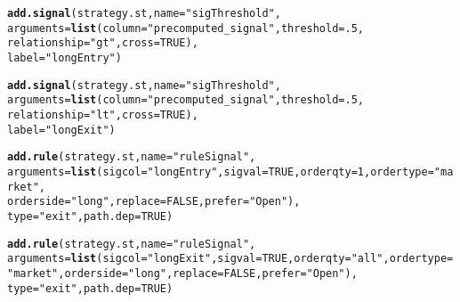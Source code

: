 \documentclass[12pt, a4paper, oneside]{article}\usepackage[]{graphicx}\usepackage[]{color}
\makeatletter
\newcommand{\hlnum}[1]{\textcolor[rgb]{0.686,0.059,0.569}{#1}}%
\newcommand{\hlstr}[1]{\textcolor[rgb]{0.192,0.494,0.8}{#1}}%
\newcommand{\hlstd}[1]{\textcolor[rgb]{0.345,0.345,0.345}{#1}}%
\newcommand{\hlkwc}[1]{\textcolor[rgb]{0.333,0.667,0.333}{#1}}%
\newcommand{\hlkwd}[1]{\textcolor[rgb]{0.737,0.353,0.396}{\textbf{#1}}}%
\newenvironment{kframe}{%
 \def\at@end@of@kframe{}%
 \ifinner\ifhmode%
  \def\at@end@of@kframe{\end{minipage}}%
  \begin{minipage}{\columnwidth}%
 \fi\fi%
 \def\FrameCommand##1{\hskip\@totalleftmargin \hskip-\fboxsep
 \colorbox{shadecolor}{##1}\hskip-\fboxsep
     \hskip-\linewidth \hskip-\@totalleftmargin \hskip\columnwidth}%
 \MakeFramed {\advance\hsize-\width
   \@totalleftmargin\z@ \linewidth\hsize
   \@setminipage}}%
 {\par\unskip\endMakeFramed%
 \at@end@of@kframe}
\newenvironment{knitrout}{}{} %
\makeatother
\begin{document}
\begin{knitrout}
\color{fgcolor}\begin{kframe}
\begin{alltt}
\hlkwd{add.signal}\hlstd{(strategy.st,} \hlkwc{name}\hlstd{=}\hlstr{"sigThreshold"}\hlstd{,}
           \hlkwc{arguments}\hlstd{=}\hlkwd{list}\hlstd{(}\hlkwc{column}\hlstd{=}\hlstr{"precomputed_signal"}\hlstd{,} \hlkwc{threshold}\hlstd{=}\hlnum{.5}\hlstd{,}
                          \hlkwc{relationship}\hlstd{=}\hlstr{"gt"}\hlstd{,} \hlkwc{cross}\hlstd{=}\hlnum{TRUE}\hlstd{),}
           \hlkwc{label}\hlstd{=}\hlstr{"longEntry"}\hlstd{)}
\end{alltt}


{\ttfamily\noindent\bfseries{}}\begin{alltt}
\hlkwd{add.signal}\hlstd{(strategy.st,} \hlkwc{name}\hlstd{=}\hlstr{"sigThreshold"}\hlstd{,}
           \hlkwc{arguments}\hlstd{=}\hlkwd{list}\hlstd{(}\hlkwc{column}\hlstd{=}\hlstr{"precomputed_signal"}\hlstd{,} \hlkwc{threshold}\hlstd{=}\hlnum{.5}\hlstd{,}
                          \hlkwc{relationship}\hlstd{=}\hlstr{"lt"}\hlstd{,} \hlkwc{cross}\hlstd{=}\hlnum{TRUE}\hlstd{),}
           \hlkwc{label}\hlstd{=}\hlstr{"longExit"}\hlstd{)}
\end{alltt}


{\ttfamily\noindent\bfseries{}}\begin{alltt}
\hlkwd{add.rule}\hlstd{(strategy.st,} \hlkwc{name}\hlstd{=}\hlstr{"ruleSignal"}\hlstd{,}
         \hlkwc{arguments}\hlstd{=}\hlkwd{list}\hlstd{(}\hlkwc{sigcol}\hlstd{=}\hlstr{"longEntry"}\hlstd{,} \hlkwc{sigval}\hlstd{=}\hlnum{TRUE}\hlstd{,} \hlkwc{orderqty}\hlstd{=}\hlnum{1}\hlstd{,} \hlkwc{ordertype}\hlstd{=}\hlstr{"market"}\hlstd{,}
                        \hlkwc{orderside}\hlstd{=}\hlstr{"long"}\hlstd{,} \hlkwc{replace}\hlstd{=}\hlnum{FALSE}\hlstd{,} \hlkwc{prefer}\hlstd{=}\hlstr{"Open"}\hlstd{),}
         \hlkwc{type}\hlstd{=}\hlstr{"exit"}\hlstd{,} \hlkwc{path.dep}\hlstd{=}\hlnum{TRUE}\hlstd{)}
\end{alltt}


{\ttfamily\noindent\bfseries{}}\begin{alltt}
\hlkwd{add.rule}\hlstd{(strategy.st,} \hlkwc{name}\hlstd{=}\hlstr{"ruleSignal"}\hlstd{,}
         \hlkwc{arguments}\hlstd{=}\hlkwd{list}\hlstd{(}\hlkwc{sigcol}\hlstd{=}\hlstr{"longExit"}\hlstd{,} \hlkwc{sigval}\hlstd{=}\hlnum{TRUE}\hlstd{,} \hlkwc{orderqty}\hlstd{=}\hlstr{"all"}\hlstd{,} \hlkwc{ordertype}\hlstd{=}\hlstr{"market"}\hlstd{,} \hlkwc{orderside}\hlstd{=}\hlstr{"long"}\hlstd{,} \hlkwc{replace}\hlstd{=}\hlnum{FALSE}\hlstd{,} \hlkwc{prefer}\hlstd{=}\hlstr{"Open"}\hlstd{),}
         \hlkwc{type}\hlstd{=}\hlstr{"exit"}\hlstd{,} \hlkwc{path.dep}\hlstd{=}\hlnum{TRUE}\hlstd{)}
\end{alltt}



\end{kframe}
\end{knitrout}
\end{document}
